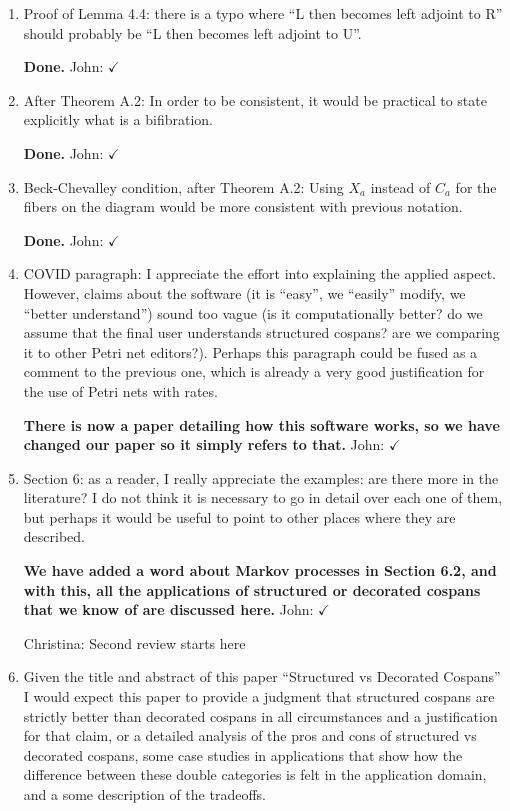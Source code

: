 \documentclass[reqno]{amsart}
\def\chris{\color{purple} Christina: }
\def\john{\color{red} John: }
\begin{document}
\begin{enumerate}
\item Proof of Lemma 4.4: there is a typo where “L then becomes left adjoint to R” should probably be “L then becomes left adjoint to U”.

{\bf Done.}  {\john $\checkmark$}

\item After Theorem A.2: In order to be consistent, it would be practical to state explicitly what is a bifibration.

{\bf Done.} {\john $\checkmark$}

\item Beck-Chevalley condition, after Theorem A.2: Using $X_a$ instead of $C_a$ for the fibers on the diagram would be more consistent with previous 
notation.

{\bf Done.} {\john $\checkmark$}

\item COVID paragraph: I appreciate the effort into explaining the applied aspect. However, claims about the software (it is “easy”, we “easily”  modify, we “better understand”) sound too vague (is it computationally better? do we assume that the final user understands structured cospans? are we comparing  it to other Petri net editors?). Perhaps this paragraph could be fused as a comment to the previous one, which is already a very good justification  for the use of Petri nets with rates.

{\bf There is now a paper detailing how this software works, so we have changed our paper
so it simply refers to that.}   {\john $\checkmark$}

\item Section 6: as a reader, I really appreciate the examples: are there more in the literature? I do not think it is necessary to go in detail over each one of them, but perhaps it would be useful to point to other places where they are described.

{\bf We have added a word about Markov processes in Section 6.2, and with this, all the applications of structured or decorated cospans that we know of are discussed here.} {\john $\checkmark$}

{\chris Second review starts here}
\item Given the title and abstract of this paper “Structured vs Decorated Cospans” I would expect this paper to provide a judgment that structured  cospans are strictly better than decorated cospans in all circumstances and a justification for that claim, or a detailed analysis of the pros and cons of 
structured vs decorated cospans, some case studies in applications that show how the difference between these double categories is felt in the application domain, and a some description of the tradeoffs. 


\end{enumerate}
\end{document}
